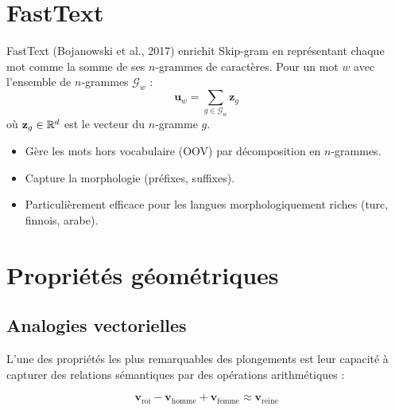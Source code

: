\section{FastText}
\label{sec:plg:fasttext}

\begin{definition}[FastText]
FastText (Bojanowski et al., 2017) enrichit Skip-gram en repr\'esentant chaque
mot comme la somme de ses $n$-grammes de caract\`eres. Pour un mot $w$ avec
l'ensemble de $n$-grammes $\mathcal{G}_w$ :
\[
\mathbf{u}_w = \sum_{g \in \mathcal{G}_w} \mathbf{z}_g
\]
o\`u $\mathbf{z}_g \in \mathbb{R}^d$ est le vecteur du $n$-gramme $g$.
\end{definition}

\begin{bonnepratique}[title=\textbf{Avantages de FastText}]
\begin{itemize}
    \item G\`ere les mots hors vocabulaire (OOV) par d\'ecomposition en $n$-grammes.
    \item Capture la morphologie (pr\'efixes, suffixes).
    \item Particuli\`erement efficace pour les langues morphologiquement riches
          (turc, finnois, arabe).
\end{itemize}
\end{bonnepratique}

\section{Propri\'et\'es g\'eom\'etriques}
\label{sec:plg:geometrie}

\subsection{Analogies vectorielles}

L'une des propri\'et\'es les plus remarquables des plongements est leur capacit\'e
\`a capturer des relations s\'emantiques par des op\'erations arithm\'etiques :

\begin{exemple}
\[
\mathbf{v}_{\text{roi}} - \mathbf{v}_{\text{homme}} + \mathbf{v}_{\text{femme}} \approx \mathbf{v}_{\text{reine}}
\]
\end{exemple}

